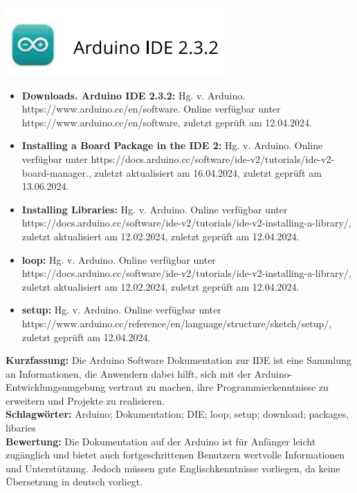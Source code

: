 {
	\includegraphics[width=0.38\linewidth]{images/IDE.jpg}
\begin{itemize}
	\item \textbf{Downloads. Arduino IDE 2.3.2:}
	Hg. v. Arduino. https://www.arduino.cc/en/software. Online verfügbar unter https://www.arduino.cc/en/software, zuletzt geprüft am 12.04.2024.
	\item \textbf{Installing a Board Package in the IDE 2:}
	Hg. v. Arduino. Online verfügbar unter https://docs.arduino.cc/software/ide-v2/tutorials/ide-v2-board-manager., zuletzt aktualisiert am 16.04.2024, zuletzt geprüft am 13.06.2024.
	\item \textbf{Installing Libraries:}
	Hg. v. Arduino. Online verfügbar unter https://docs.arduino.cc/software/ide-v2/tutorials/ide-v2-installing-a-library/, zuletzt aktualisiert am 12.02.2024, zuletzt geprüft am 12.04.2024.
	\item \textbf{loop:} Hg. v. Arduino. Online verfügbar unter https://docs.arduino.cc/software/ide-v2/tutorials/ide-v2-installing-a-library/, zuletzt aktualisiert am 12.02.2024, zuletzt geprüft am 12.04.2024.
	\item \textbf{setup:} Hg. v. Arduino. Online verfügbar unter https://www.arduino.cc/reference/en/language/structure/sketch/setup/, zuletzt geprüft am 12.04.2024.
\end{itemize}
\textbf{Kurzfassung:}
Die Arduino Software Dokumentation zur IDE ist eine Sammlung an Informationen, die Anwendern dabei hilft, sich mit der Arduino-Entwicklungsumgebung vertraut zu machen, ihre Programmierkenntnisse zu erweitern und Projekte zu realisieren. 
\\ \textbf{Schlagwörter:}
Arduino; Dokumentation; DIE; loop; setup; download; packages, libaries
\\ \textbf{Bewertung:}
Die Dokumentation auf der Arduino ist für Anfänger leicht zugänglich und bietet auch fortgeschrittenen Benutzern wertvolle Informationen und Unterstützung. Jedoch müssen gute Englischkenntnisse vorliegen, da keine Übersetzung in deutsch vorliegt.
}

